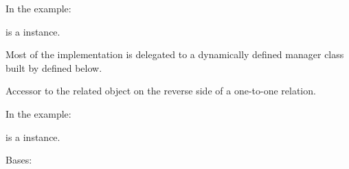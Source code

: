 \documentclass[letterpaper,10pt,english]{sphinxmanual}
\begin{document}
\begin{fulllineitems}
\begin{fulllineitems}
In the example:

%
\begin{sphinxVerbatim}[commandchars=\\\{\}]
 
       
\end{sphinxVerbatim}

 is a  instance.

Most of the implementation is delegated to a dynamically defined manager
class built by  defined below.

\end{fulllineitems}


\begin{fulllineitems}
\label{\detokenize{QuChemPedIA.models:QuChemPedIA.models.SoftwareModel.Software.importrule}}
Accessor to the related object on the reverse side of a one-to-one
relation.

In the example:

%
\begin{sphinxVerbatim}[commandchars=\\\{\}]
 
       
\end{sphinxVerbatim}

 is a  instance.

\end{fulllineitems}


\begin{fulllineitems}
\label{\detokenize{QuChemPedIA.models:QuChemPedIA.models.SoftwareModel.Software.meta}}
Bases: 


\end{fulllineitems}
\end{fulllineitems}
\end{document}
